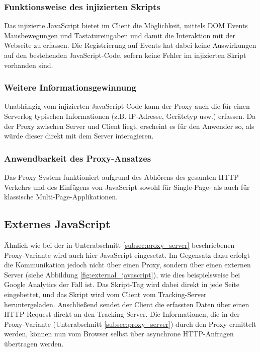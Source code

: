 \subsubsection{Funktionsweise des injizierten Skripts}
Das injizierte JavaScript bietet im Client die Möglichkeit, mittels DOM Events \cite{mdn2025_domevents} Mausbewegungen und Tastatureingaben und damit die Interaktion mit der Webseite zu erfassen. Die Registrierung auf Events hat dabei keine Auswirkungen auf den bestehenden JavaScript-Code, sofern keine Fehler im injizierten Skript vorhanden sind.

\subsubsection{Weitere Informationsgewinnung}
Unabhängig vom injizierten JavaScript-Code kann der Proxy auch die für einen Serverlog typischen Informationen (z.B. IP-Adresse, Gerätetyp usw.) erfassen. Da der Proxy zwischen Server und Client liegt, erscheint es für den Anwender so, als würde dieser direkt mit dem Server interagieren.

\subsubsection{Anwendbarkeit des Proxy-Ansatzes}
Das Proxy-System funktioniert aufgrund des Abhörens des gesamten HTTP-Verkehrs und des Einfügens von JavaScript sowohl für Single-Page- als auch für klassische Multi-Page-Applikationen.

\subsection{Externes JavaScript}
\label{subsec:external_js}
Ähnlich wie bei der in Unterabschnitt \ref{subsec:proxy_server} beschriebenen Proxy-Variante wird auch hier JavaScript eingesetzt. Im Gegensatz dazu erfolgt die Kommunikation jedoch nicht über einen Proxy, sondern über einen externen Server (siehe Abbildung \ref{fig:external_javascript}), wie dies beispielsweise bei Google Analytics \cite{weber2015practical} der Fall ist. Das Skript-Tag wird dabei direkt in jede Seite eingebettet, und das Skript wird vom Client vom Tracking-Server heruntergeladen. Anschließend sendet der Client die erfassten Daten über einen HTTP-Request direkt an den Tracking-Server.  
Die Informationen, die in der Proxy-Variante (Unterabschnitt \ref{subsec:proxy_server}) durch den Proxy ermittelt werden, können nun vom Browser selbst über asynchrone HTTP-Anfragen übertragen werden.

